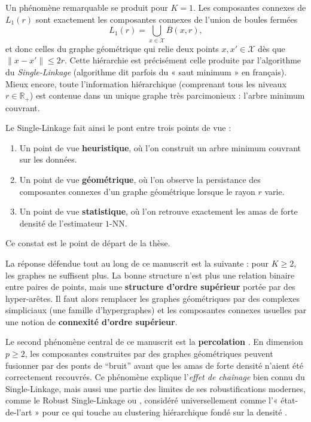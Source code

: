 Un phénomène remarquable se produit pour $K=1$. Les composantes connexes de $L_1(r)$ sont exactement les composantes connexes de l'union de boules fermées
\[
    L_1(r)
    =
    \bigcup_{x\in \mathcal X} \overline B(x,r),
\]
et donc celles du graphe géométrique qui relie deux points $x,x'\in \mathcal X$ dès que $\|x-x'\|\leq 2r$. 
Cette hiérarchie est précisément celle produite par l'algorithme du \emph{Single-Linkage} \cite{DendriteSingleLinkage1951, GowerRoss1969} (algorithme dit parfois du « saut minimum » en français). Mieux encore, toute l'information hiérarchique (comprenant tous les niveaux $r \in \mathbb R_+$) est contenue dans un unique graphe très parcimonieux : l'arbre minimum couvrant.

Le Single-Linkage fait ainsi le pont entre trois points de vue :
\begin{enumerate}
    \item Un point de vue \textbf{heuristique}, où l'on construit un arbre minimum couvrant sur les données.
    \item Un point de vue \textbf{géométrique}, où l'on observe la persistance des composantes connexes d'un graphe géométrique \cite{penrose2003} lorsque le rayon $r$ varie.
    \item Un point de vue \textbf{statistique}, où l'on retrouve exactement les amas de forte densité de l'estimateur $1$-NN.
\end{enumerate}

Ce constat est le point de départ de la thèse. 

La réponse défendue tout au long de ce manuscrit est la suivante : pour $K\geq2$, les graphes ne suffisent plus. La bonne structure n'est plus une relation binaire entre paires de points, mais une \textbf{structure d'ordre supérieur} portée par des hyper-arêtes. Il faut alors remplacer les graphes géométriques par des complexes simpliciaux (une famille d'hypergraphes) et les composantes connexes usuelles par une notion de \textbf{connexité d'ordre supérieur}.

Le second phénomène central de ce manuscrit est la \textbf{percolation} \cite{penrose2003}. En dimension $p\geq2$, les composantes construites par des graphes géométriques peuvent fusionner par des ponts de ``bruit'' avant que les amas de forte densité n'aient été correctement recouvrés. Ce phénomène explique l'\emph{effet de chaînage} bien connu du Single-Linkage, mais aussi une partie des limites de ses robustifications modernes, comme le Robust Single-Linkage \cite{RobustSingleLinkage1969, RobustSingleLinkage2010} ou \HDBSCAN \cite{HDBSCAN, HDBSCAN2017}, considéré universellement comme l'« état-de-l'art » pour ce qui touche au clustering hiérarchique fondé sur la densité \cite{HDBSCAN2025SOTA, FLASC2025}.


